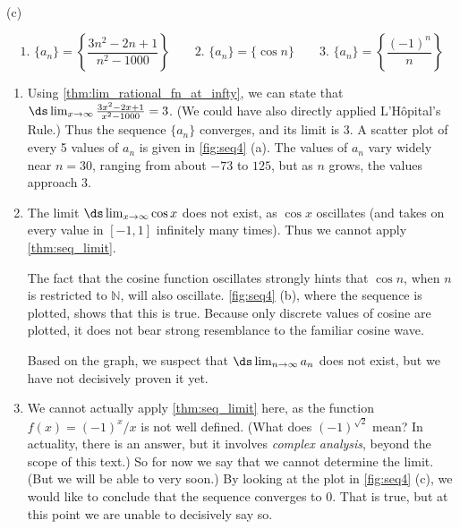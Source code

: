\begin{example}
{
\\(c)}
%
\[
 \text{1. }\{a_n\} = \left\{\frac{3n^2-2n+1}{n^2-1000}\right\}\qquad
 \text{2. }\{a_n\} = \{\cos n \}\qquad
 \text{3. }\{a_n\} = \left\{\frac{(-1)^n}{n}\right\}
\]
\solution
\begin{enumerate}
\item		Using \autoref{thm:lim_rational_fn_at_infty}, we can state that $\ds\lim_{x\to\infty} \frac{3x^2-2x+1}{x^2-1000} = 3$. (We could have also directly applied L'H\^opital's Rule.) Thus the sequence $\{a_n\}$ converges, and its limit is 3. A scatter plot of every 5 values of $a_n$ is given in \autoref{fig:seq4} (a). The values of $a_n$ vary widely near $n=30$, ranging from about $-73$ to $125$, but as $n$ grows, the values approach 3.

\item		The limit $\ds\lim_{x\to\infty}\cos x$ does not exist, as $\cos x$ oscillates (and takes on every value in $[-1,1]$ infinitely many times). Thus we cannot apply \autoref{thm:seq_limit}. 

The fact that the cosine function oscillates strongly hints that $\cos n$, when $n$ is restricted to $\mathbb{N}$, will also oscillate. \autoref{fig:seq4} (b), where the sequence is plotted, shows that this is true. Because only discrete values of cosine are plotted, it does not bear strong resemblance to the familiar cosine wave.

Based on the graph, we suspect that $\ds \lim_{n\to\infty} a_n$ does not exist, but we have not decisively proven it yet.


\item		We cannot actually apply \autoref{thm:seq_limit} here, as the function $f(x) = (-1)^x/x$ is not well defined. (What does $(-1)^{\sqrt{2}}$ mean? In actuality, there is an answer, but it involves \emph{complex analysis}, beyond the scope of this text.) So for now we say that we cannot determine the limit. (But we will be able to very soon.) By looking at the plot in \autoref{fig:seq4} (c), we would like to conclude that the sequence converges to 0. That is true, but at this point we are unable to decisively say so.
\end{enumerate}
\end{example}


